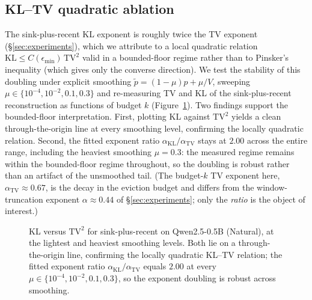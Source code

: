 \documentclass[11pt]{article}
\newcommand{\KLs}{\mathrm{KL}}
\newcommand{\TV}{\mathrm{TV}}
\theoremstyle{plain}
\theoremstyle{definition}
\theoremstyle{remark}
\begin{document}
\subsection{KL--TV quadratic ablation}
\label{app:kltv-ablation}
The sink-plus-recent KL exponent is roughly twice the TV exponent
(\S\ref{sec:experiments}), which we attribute to a local quadratic
relation $\KLs \le C(\epsilon_{\min})\,\TV^2$ valid in a bounded-floor
regime rather than to Pinsker's inequality (which gives only the
converse direction). We test the stability of this doubling under
explicit smoothing $\tilde p = (1-\mu)p + \mu/V$, sweeping
$\mu \in \{10^{-4}, 10^{-2}, 0.1, 0.3\}$ and re-measuring TV and KL of
the sink-plus-recent reconstruction as functions of budget $k$
(Figure~\ref{fig:kltv}). Two findings support the bounded-floor
interpretation. First, plotting KL against $\TV^2$ yields a clean
through-the-origin line at every smoothing level, confirming the
locally quadratic relation. Second, the fitted exponent ratio
$\alpha_{\KLs}/\alpha_{\TV}$ stays at $2.00$ across the entire range,
including the heaviest smoothing $\mu = 0.3$: the measured regime
remains within the bounded-floor regime throughout, so the doubling is
robust rather than an artifact of the unsmoothed tail. (The
budget-$k$ TV exponent here, $\alpha_{\TV} \approx 0.67$, is the decay
in the eviction budget and differs from the window-truncation
exponent $\alpha \approx 0.44$ of \S\ref{sec:experiments}; only the
\emph{ratio} is the object of interest.)

\begin{figure}[ht]
\centering
{}
\caption{KL versus $\TV^2$ for sink-plus-recent on Qwen2.5-0.5B
(Natural), at the lightest and heaviest smoothing levels. Both lie on
a through-the-origin line, confirming the locally quadratic KL--TV
relation; the fitted exponent ratio $\alpha_{\KLs}/\alpha_{\TV}$
equals $2.00$ at every $\mu \in \{10^{-4}, 10^{-2}, 0.1, 0.3\}$, so the
exponent doubling is robust across smoothing.}
\label{fig:kltv}
\end{figure}
\end{document}
